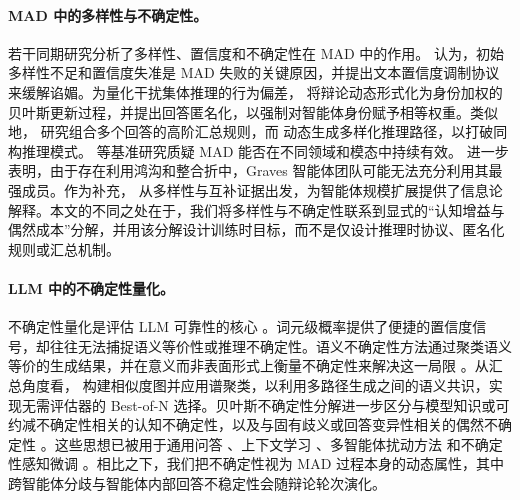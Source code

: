 \documentclass{article}
\theoremstyle{plain}
\theoremstyle{definition}
\theoremstyle{remark}
\begin{document}
\paragraph{MAD 中的多样性与不确定性。}
若干同期研究分析了多样性、置信度和不确定性在 MAD 中的作用。\citet{zhu2026demystifying} 认为，初始多样性不足和置信度失准是 MAD 失败的关键原因，并提出文本置信度调制协议来缓解谄媚。为量化干扰集体推理的行为偏差，\citet{choi2025identity} 将辩论动态形式化为身份加权的贝叶斯更新过程，并提出回答匿名化，以强制对智能体身份赋予相等权重。类似地，\citet{ai2025beyond} 研究组合多个回答的高阶汇总规则，而 \citet{li2026dynadebate} 动态生成多样化推理路径，以打破同构推理模式。\citet{li2026m3mad} 等基准研究质疑 MAD 能否在不同领域和模态中持续有效。\citet{pappu2026multi} 进一步表明，由于存在利用鸿沟和整合折中，Graves 智能体团队可能无法充分利用其最强成员。作为补充，\citet{yang2026understanding} 从多样性与互补证据出发，为智能体规模扩展提供了信息论解释。本文的不同之处在于，我们将多样性与不确定性联系到显式的“认知增益与偶然成本”分解，并用该分解设计训练时目标，而不是仅设计推理时协议、匿名化规则或汇总机制。

\paragraph{LLM 中的不确定性量化。}
不确定性量化是评估 LLM 可靠性的核心 \cite{huang2025look}。词元级概率提供了便捷的置信度信号，却往往无法捕捉语义等价性或推理不确定性。语义不确定性方法通过聚类语义等价的生成结果，并在意义而非表面形式上衡量不确定性来解决这一局限 \cite{kuhnsemantic, wang2025measuring}。从汇总角度看，\citet{choi2026modex} 构建相似度图并应用谱聚类，以利用多路径生成之间的语义共识，实现无需评估器的 Best-of-N 选择。贝叶斯不确定性分解进一步区分与模型知识或可约减不确定性相关的认知不确定性，以及与固有歧义或回答变异性相关的偶然不确定性 \cite{liu2025uncertainty, huang2024survey, geng2024confidencesurvey}。这些思想已被用于通用问答 \cite{abbasi2024believe}、上下文学习 \cite{jayasekera2025variational, ling2024uncertainty}、多智能体扰动方法 \cite{amayuelas2024knowledge} 和不确定性感知微调 \cite{feng2025rethinking}。相比之下，我们把不确定性视为 MAD 过程本身的动态属性，其中跨智能体分歧与智能体内部回答不稳定性会随辩论轮次演化。
\end{document}
